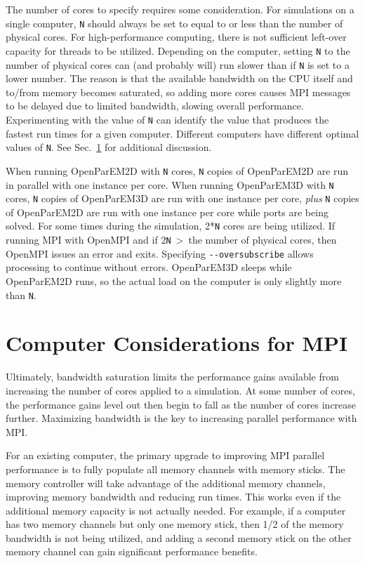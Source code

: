 \documentclass[titlepage]{article}
\renewcommand\_{\textunderscore\linebreak[1]}
\begin{document}
The number of cores to specify requires some consideration.  For simulations on a single computer, \verb+N+ should always be set to equal to or less than the number of physical cores.  For high-performance computing, there is not sufficient left-over capacity for threads to be utilized.  Depending on the computer, setting \verb+N+ to the number of physical cores can (and probably will) run slower than if \verb+N+ is set to a lower number.  The reason is that the available bandwidth on the CPU itself and to/from memory becomes saturated, so adding more cores causes MPI messages to be delayed due to limited bandwidth, slowing overall performance.  Experimenting with the value of \verb+N+ can identify the value that produces the fastest run times for a given computer.  Different computers have different optimal values of \verb+N+.  See Sec.~\ref{sec:computer} for additional discussion.

When running OpenParEM2D with \verb+N+ cores, \verb+N+ copies of OpenParEM2D are run in parallel with one instance per core.  When running OpenParEM3D with \verb+N+ cores, \verb+N+ copies of OpenParEM3D are run with one instance per core, \textit{plus} \verb+N+ copies of OpenParEM2D are run with one instance per core while ports are being solved.  For some times during the simulation, 2*\verb+N+ cores are being utilized.  If running MPI with OpenMPI and if 2\verb+N+~\textgreater~the number of physical cores, then OpenMPI issues an error and exits.  Specifying \verb+--oversubscribe+ allows processing to continue without errors.  OpenParEM3D sleeps while OpenParEM2D runs, so the actual load on the computer is only slightly more than \verb+N+.

\section{Computer Considerations for MPI}
\label{sec:computer}

Ultimately, bandwidth saturation limits the performance gains available from increasing the number of cores applied to a simulation.  At some number of cores, the performance gains level out then begin to fall as the number of cores increase further.  Maximizing bandwidth is the key to increasing parallel performance with MPI.

For an existing computer, the primary upgrade to improving MPI parallel performance is to fully populate all memory channels with memory sticks.  The memory controller will take advantage of the additional memory channels, improving memory bandwidth and reducing run times.  This works even if the additional memory capacity is not actually needed.  For example, if a computer has two memory channels but only one memory stick, then 1/2 of the memory bandwidth is not being utilized, and adding a second memory stick on the other memory channel can gain significant performance benefits.
\end{document}
